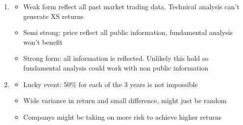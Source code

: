 \documentclass[]{book}
\providecommand{\tightlist}{%
  \setlength{\itemsep}{0pt}\setlength{\parskip}{0pt}}
\theoremstyle{definition}
\theoremstyle{definition}
\theoremstyle{remark}
\begin{document}
\begin{enumerate}
\def\labelenumi{\alph{enumi}.}
\item
  \begin{itemize}
  \tightlist
  \item
    Weak form reflect all past market trading data. Technical analysis
    can't generate XS returns
  \item
    Semi strong: price reflect all public information, fundamental
    analysis won't benefit
  \item
    Strong form: all information is reflected. Unlikely this hold so
    fundamental analysis could work with non public information
  \end{itemize}
\item
  \begin{itemize}
  \tightlist
  \item
    Lucky event: 50\% for each of the 3 years is not impossible
  \item
    Wide variance in return and small difference, might just be random
  \item
    Companys might be taking on more risk to achieve higher returns
  \end{itemize}
\end{enumerate}
\end{document}
